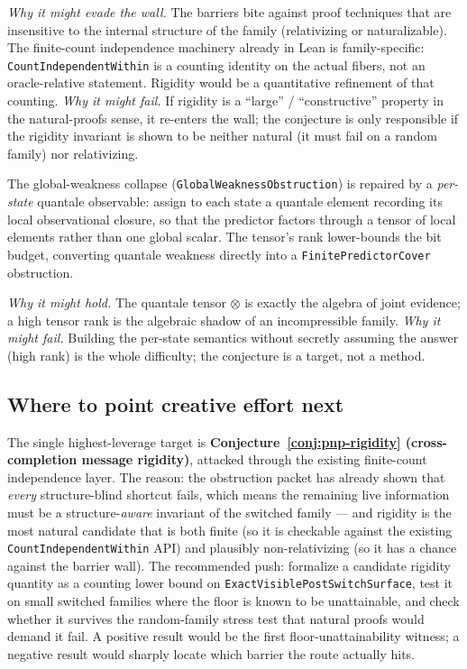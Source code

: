 \noindent\emph{Why it might evade the wall.} The barriers bite against proof
techniques that are insensitive to the internal structure of the family
(relativizing or naturalizable). The finite-count independence machinery already
in Lean is family-specific: \verb|CountIndependentWithin| is a counting identity
on the actual fibers, not an oracle-relative statement. Rigidity would be a
quantitative refinement of that counting. \emph{Why it might fail.} If rigidity
is a ``large'' / ``constructive'' property in the natural-proofs sense, it
re-enters the wall; the conjecture is only responsible if the rigidity invariant
is shown to be neither natural (it must fail on a random family) nor
relativizing.

\begin{conjecture}
\label{conj:pnp-quantale}
The global-weakness collapse
(\verb|GlobalWeaknessObstruction|) is repaired by a \emph{per-state} quantale
observable: assign to each state a quantale element recording its local
observational closure, so that the predictor factors through a tensor of local
elements rather than one global scalar. The tensor's rank lower-bounds the bit
budget, converting quantale weakness directly into a
\verb|FinitePredictorCover| obstruction.
\end{conjecture}

\noindent\emph{Why it might hold.} The quantale tensor $\otimes$ is exactly the
algebra of joint evidence; a high tensor rank is the algebraic shadow of an
incompressible family. \emph{Why it might fail.} Building the per-state semantics
without secretly assuming the answer (high rank) is the whole difficulty; the
conjecture is a target, not a method.

\subsection{Where to point creative effort next}

The single highest-leverage target is
\textbf{Conjecture~\ref{conj:pnp-rigidity} (cross-completion message rigidity)},
attacked through the existing finite-count independence layer. The reason: the
obstruction packet has already shown that \emph{every} structure-blind shortcut
fails, which means the remaining live information must be a structure-\emph{aware}
invariant of the switched family --- and rigidity is the most natural candidate
that is both finite (so it is checkable against the existing
\verb|CountIndependentWithin| API) and plausibly non-relativizing (so it has a
chance against the barrier wall). The recommended push: formalize a candidate
rigidity quantity as a counting lower bound on
\verb|ExactVisiblePostSwitchSurface|, test it on small switched families where
the floor is known to be unattainable, and check whether it survives the
random-family stress test that natural proofs would demand it fail. A positive
result would be the first floor-unattainability witness; a negative result would
sharply locate which barrier the route actually hits.

